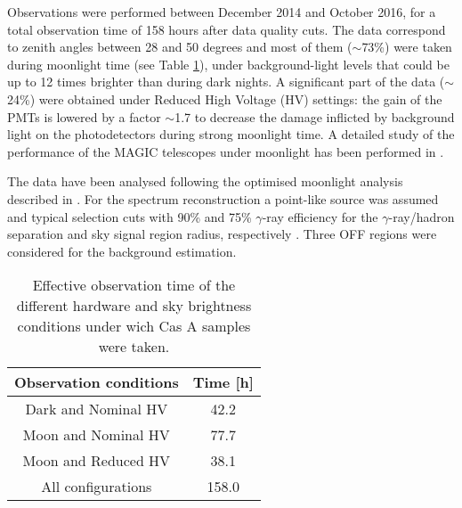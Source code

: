 \documentclass{PoS}
\begin{document}
Observations were performed between December 2014 and October 2016, for a total observation time of 158 hours after data quality cuts. The data correspond to zenith angles between 28 and 50 degrees and most of them ($\sim$73\%) were taken during moonlight time (see Table \ref{tabTime}), under background-light levels that could be up to 12 times brighter than during dark nights. A significant part of the data ($\sim$24\%) were obtained under Reduced High Voltage (HV) settings: the gain of the PMTs is lowered by a factor $\sim$1.7 to decrease the damage inflicted by background light on the photodetectors during strong moonlight time. A detailed study of the performance of the MAGIC telescopes under moonlight has been performed in \cite{MAGIC_moon}.

The data have been analysed following the optimised moonlight analysis described in \cite{MAGIC_moon}. For the spectrum reconstruction a point-like source was assumed and typical selection cuts with 90\% and 75\% $\gamma$-ray efficiency for the $\gamma$-ray/hadron separation and sky signal region radius, respectively \cite{Magic_performanceII}. Three OFF regions were considered for the background estimation.


 \begin{table}
\centering
 \caption{Effective observation time of the different hardware and sky brightness conditions under wich Cas A samples were taken.}\label{tabTime}
\begin{tabular}{ c  c }
\hline
Observation conditions & Time [h] \\
\hline
   \hline

     Dark and Nominal HV & 42.2 \\
     Moon and Nominal HV & 77.7 \\     
     Moon and Reduced HV & 38.1 \\     
   \hline
   All configurations & 158.0 \\
 \end{tabular}
 \end{table}


\end{document}
